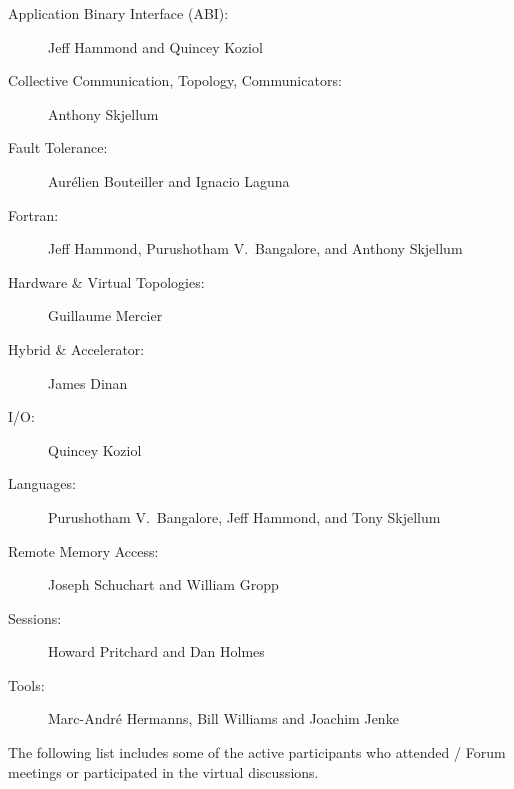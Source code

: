 {\raggedright
\begin{description}
\item[Application Binary Interface (ABI):]Jeff Hammond and Quincey Koziol
\item[Collective Communication, Topology, Communicators:]Anthony Skjellum
\item[Fault Tolerance:]Aur\'elien Bouteiller and Ignacio Laguna
\item[Fortran:]Jeff Hammond, Purushotham V.~Bangalore, and Anthony Skjellum
\item[Hardware \& Virtual Topologies:]Guillaume Mercier
\item[Hybrid \& Accelerator:]James Dinan
\item[I/O:]Quincey Koziol
\item[Languages:]Purushotham V.~Bangalore, Jeff Hammond, and Tony Skjellum
\item[Remote Memory Access:]Joseph Schuchart and William Gropp
\item[Sessions:]Howard Pritchard and Dan Holmes
\item[Tools:]Marc-Andr\'e Hermanns, Bill Williams and Joachim Jenke
\end{description}
}

The following list includes some of the active participants who
attended \MPI/ Forum meetings or participated in the virtual
discussions.

